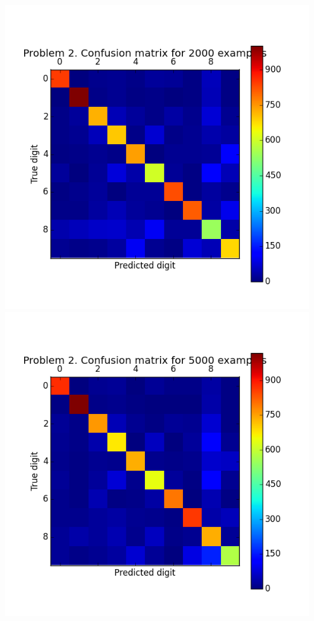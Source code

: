 \documentclass[11pt]{article}
\begin{document}
\includegraphics[scale=0.6]{figure6}
\includegraphics[scale=0.6]{figure7}
\end{document}
